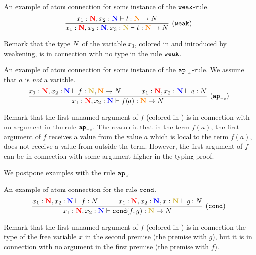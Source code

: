 \documentclass{article}
\begin{document}
\begin{Eg}\label{eg:0}\rm
An example of  atom connection for some instance of the ${\tt weak}$-rule.
\[
\infer[(\weak)]{
        {x_1} : \bfColor{red}{\N},{x_2} : \bfColor{blue}{\N}, x_3:\bfColor{oldgold}{\N}
		\prove t : \bfColor{orange}{\N} \rightarrow \N
}{
  {x_1} : \bfColor{red}{\N},{x_2} : \bfColor{blue}{\N} 
  \prove t : \bfColor{orange}{\N} \rightarrow \N
}
\]
\end{Eg}
Remark that the type ${N}$ of the variable $x_3$, colored in  and 
introduced by weakening, is in connection with no type in the rule ${\tt weak}$.

\begin{Eg}\label{eg:1}%
An example of  atom connection for some instance of the ${{\tt ap}_{\mbox{\tiny $\neg v$}}}$-rule.
We assume that $a$ is \emph{not} a variable.
\[
\infer[(\apnotvar)]{
  x_1 : \bfColor{red}{\N},{x_2} : \bfColor{blue}{\N}
  \prove f(a) : \bfColor{orange}{\N} \rightarrow \N
}{
  x_1 : \bfColor{red}{\N},{x_2} : \bfColor{blue}{\N}
  \prove f : \bfColor{oldgold}{\N}, \bfColor{orange}{\N} \rightarrow \N
  &
  \quad
  &
  x_1 : \bfColor{red}{\N}, x_2: \bfColor{blue}{\N} \prove a : \N
}
\]
\end{Eg}
Remark that the first unnamed argument of $f$ (colored in ) 
is in connection with no argument in the rule ${{\tt ap}_{\mbox{\tiny $\neg v$}}}$.
The reason is that in the term $f(a)$,
the first argument of $f$ receives a value from the value $a$ which is local to the term $f(a)$,
does not receive a value from outside the term.
However, the first argument of $f$ can be in connection with some argument higher in the typing proof. 

We postpone examples with the rule ${{\tt ap}_{\mbox{\tiny $v$}}}$.

\begin{Eg}\label{eg:2}%
An example of  atom connection for the rule ${\tt cond}$.
\[
\infer[(\cond)]{
  {x_1} : \bfColor{red}{\N},{x_2} : \bfColor{blue}{\N}
  \prove \cond(f,g) : \bfColor{oldgold}{\N} \rightarrow \N
}{
  x_1 : \bfColor{red}{\N},{x_2} : \bfColor{blue}{\N} \prove f : \N
  &
  \quad
  &
  x_1:\bfColor{red}{\N}, x_2:\bfColor{blue}{\N}, x:\bfColor{oldgold}{\N} \prove g:\N
}
\]
\end{Eg}
Remark that the first unnamed argument of $f$ (colored in ) 
is in connection the type of the free variable $x$ in the second premise (the premise with $g$),
but it is in connection with no argument in the first premise (the premise with $f$).
\end{document}
